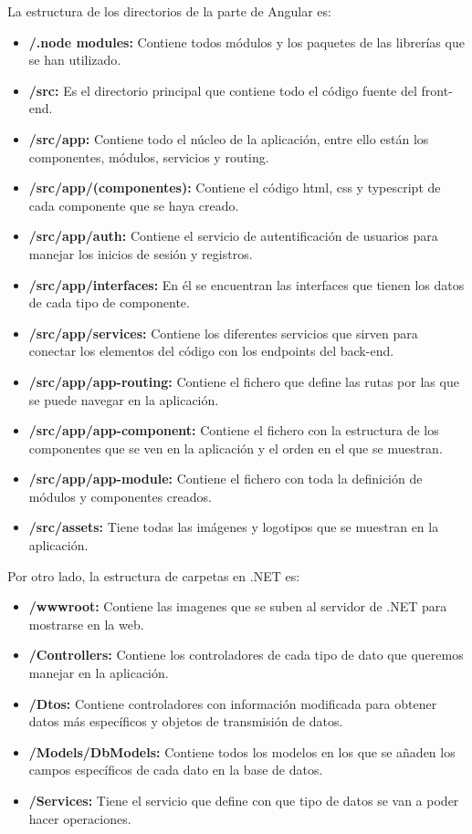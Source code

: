 La estructura de los directorios de la parte de Angular es:
\begin{itemize}
\tightlist
    \item
    \textbf{/.node modules:} Contiene todos módulos y los paquetes de las librerías que se han utilizado.
    \item 
    \textbf{/src:} Es el directorio principal que contiene todo el código fuente del front-end. 
    \item
    \textbf{/src/app:} Contiene todo el núcleo de la aplicación, entre ello están los componentes, módulos, servicios y routing.
    \item
    \textbf{/src/app/(componentes):} Contiene el código html, css y typescript de cada componente que se haya creado.
    \item
    \textbf{/src/app/auth:} Contiene el servicio de autentificación de usuarios para manejar los inicios de sesión y registros.
    \item
    \textbf{/src/app/interfaces:} En él se encuentran las interfaces que tienen los datos de cada tipo de componente.
    \item
    \textbf{/src/app/services:} Contiene los diferentes servicios que sirven para conectar los elementos del código con los endpoints del back-end.
    \item
    \textbf{/src/app/app-routing:} Contiene el fichero que define las rutas por las que se puede navegar en la aplicación.
    \item
    \textbf{/src/app/app-component:} Contiene el fichero con la estructura de los componentes que se ven en la aplicación y el orden en el que se muestran.
    \item
    \textbf{/src/app/app-module:} Contiene el fichero con toda la definición de módulos y componentes creados.
    \item
    \textbf{/src/assets:} Tiene todas las imágenes y logotipos que se muestran en la aplicación.
\end{itemize}

Por otro lado, la estructura de carpetas en .NET es:
\begin{itemize}
\tightlist
    \item 
    \textbf{/wwwroot:} Contiene las imagenes que se suben al servidor de .NET para mostrarse en la web.
    \item 
    \textbf{/Controllers:} Contiene los controladores de cada tipo de dato que queremos manejar en la aplicación.
    \item 
    \textbf{/Dtos:} Contiene controladores con información modificada para obtener datos más específicos y objetos de transmisión de datos.
    \item 
    \textbf{/Models/DbModels:} Contiene todos los modelos en los que se añaden los campos específicos de cada dato en la base de datos.
    \item 
    \textbf{/Services:} Tiene el servicio que define con que tipo de datos se van a poder hacer operaciones.
\end{itemize}

